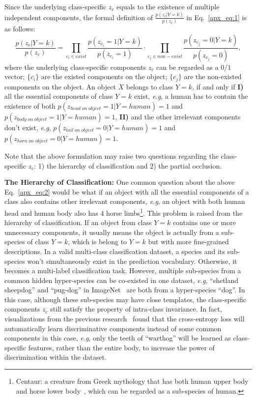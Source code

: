 \documentclass{article}
\def\eg{\emph{e.g}} \def\Eg{\emph{E.g}}
\begin{document}
Since the underlying class-specific $z_c$ equals to the existence of multiple independent components, the formal definition of $\frac{p(z_c|Y=k)}{p(z_c)}$ in Eq.~\eqref{apx_eq:1} is as follows:
\begin{equation}
    \frac{p(z_c|Y=k)}{p(z_c)} = \prod_{c_i \in exist} \frac{p(z_{c_i}=1|Y=k)}{p(z_{c_i}=1)} \cdot \prod_{c_j \in non-exist}  \frac{p(z_{c_j}=0|Y=k)}{p(z_{c_j}=0)},
    \label{apx_eq:2}
\end{equation}
where the underlying class-specific components $z_c$ can be regarded as a $0/1$ vector; $\{c_i\}$ are the existed components on the object; $\{c_j\}$ are the non-existed components on the object. An object $X$ belongs to class $Y=k$, if and only if \textbf{I)} all the essential components of class $Y=k$ exist, \eg, a human has to contain the existence of both $p(z_{head\;on\;object}=1|Y=human)=1$ and $p(z_{body\;on\;object}=1|Y=human)=1$, \textbf{II)} and the other irrelevant components don't exist, \eg, $p(z_{tail\;on\;object}=0|Y=human)=1$ and $p(z_{horn\;on\;object}=0|Y=human)=1$. 

Note that the above formulation may raise two questions regarding the class-specific $z_c$: 1) the hierarchy of classification and 2) the partial occlusion.

\textbf{The Hierarchy of Classification:} One common question about the above Eq.~\eqref{apx_eq:2} would be what if an object with all the essential components of a class also contains other irrelevant components, \eg, an object with both human head and human body also has 4 horse limbs\footnote{Centaur: a creature from Greek mythology that has both human upper body and horse lower body~\cite{centaur}, which can be regarded as a sub-species of human.}. This problem is raised from the hierarchy of classification. If an object from class $Y=k$ contains one or more unnecessary components, it usually means the object is actually from a sub-species of class $Y=k$, which is belong to $Y=k$ but with more fine-grained descriptions. In a valid multi-class classification dataset, a species and its sub-species won't simultaneously exist in the prediction vocabulary. Otherwise, it becomes a multi-label classification task. However, multiple sub-species from a common hidden hyper-species can be co-existed in one dataset, \eg, ``shetland sheepdog'' and ``pug-dog'' in ImageNet~\cite{russakovsky2015imagenet} are both from a hyper-species ``dog''. In this case, although these sub-species may have close templates, the class-specific components $z_c$ still satisfy the property of intra-class invariance. In fact, visualizations from the previous research~\cite{tang2020long} found that the cross-entropy loss will automatically learn discriminative components instead of some common components in this case, \eg, only the teeth of ``warthog'' will be learned as class-specific features, rather than the entire body, to increase the power of discrimination within the dataset.
\end{document}
